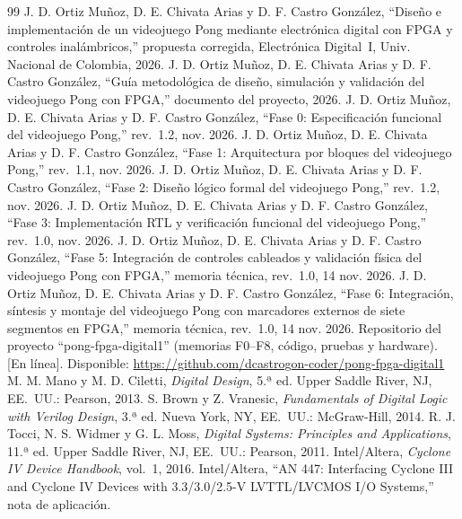 \documentclass[conference,a4paper]{IEEEtran}
\begin{document}
\begin{thebibliography}{99}
 J. D. Ortiz Muñoz, D. E. Chivata Arias y D. F. Castro González, ``Diseño e implementación de un videojuego Pong mediante electrónica digital con FPGA y controles inalámbricos,'' propuesta corregida, Electrónica Digital~I, Univ. Nacional de Colombia, 2026.
 J. D. Ortiz Muñoz, D. E. Chivata Arias y D. F. Castro González, ``Guía metodológica de diseño, simulación y validación del videojuego Pong con FPGA,'' documento del proyecto, 2026.
 J. D. Ortiz Muñoz, D. E. Chivata Arias y D. F. Castro González, ``Fase 0: Especificación funcional del videojuego Pong,'' rev.~1.2, nov. 2026.
 J. D. Ortiz Muñoz, D. E. Chivata Arias y D. F. Castro González, ``Fase 1: Arquitectura por bloques del videojuego Pong,'' rev.~1.1, nov. 2026.
 J. D. Ortiz Muñoz, D. E. Chivata Arias y D. F. Castro González, ``Fase 2: Diseño lógico formal del videojuego Pong,'' rev.~1.2, nov. 2026.
 J. D. Ortiz Muñoz, D. E. Chivata Arias y D. F. Castro González, ``Fase 3: Implementación RTL y verificación funcional del videojuego Pong,'' rev.~1.0, nov. 2026.
 J. D. Ortiz Muñoz, D. E. Chivata Arias y D. F. Castro González, ``Fase 5: Integración de controles cableados y validación física del videojuego Pong con FPGA,'' memoria técnica, rev.~1.0, 14 nov. 2026.
 J. D. Ortiz Muñoz, D. E. Chivata Arias y D. F. Castro González, ``Fase 6: Integración, síntesis y montaje del videojuego Pong con marcadores externos de siete segmentos en FPGA,'' memoria técnica, rev.~1.0, 14 nov. 2026.
 Repositorio del proyecto ``pong-fpga-digital1'' (memorias F0--F8, código, pruebas y hardware). [En línea]. Disponible: \url{https://github.com/dcastrogon-coder/pong-fpga-digital1}
 M. M. Mano y M. D. Ciletti, \textit{Digital Design}, 5.ª ed. Upper Saddle River, NJ, EE.~UU.: Pearson, 2013.
 S. Brown y Z. Vranesic, \textit{Fundamentals of Digital Logic with Verilog Design}, 3.ª ed. Nueva York, NY, EE.~UU.: McGraw-Hill, 2014.
 R. J. Tocci, N. S. Widmer y G. L. Moss, \textit{Digital Systems: Principles and Applications}, 11.ª ed. Upper Saddle River, NJ, EE.~UU.: Pearson, 2011.
 Intel/Altera, \textit{Cyclone IV Device Handbook}, vol.~1, 2016.
 Intel/Altera, ``AN 447: Interfacing Cyclone III and Cyclone IV Devices with 3.3/3.0/2.5-V LVTTL/LVCMOS I/O Systems,'' nota de aplicación.

\end{thebibliography}
\end{document}
